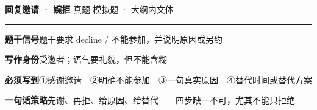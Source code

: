 \documentclass[11pt,a4paper]{ctexart}
\begin{document}
\clearpage
{}\label{g03}
\noindent{\color{accent}\rule{\linewidth}{1.5pt}}\par\vspace{3pt}
\hspace{6pt}
{\LARGE\bfseries 回复邀请 · 婉拒}\hfill
{\footnotesize\color{gray} 真题 模拟题 · 大纲内文体}\par
\vspace{1pt}
{\color{accent!35}\rule{\linewidth}{0.5pt}}\par\vspace{3pt}
{\footnotesize {\color{accent}\bfseries 题干信号}\quad 题干要求 decline / 不能参加，并说明原因或另约}\par
{\footnotesize {\color{accent}\bfseries 写作身份}\quad 受邀者；语气要礼貌，但不能含糊}\par
{\footnotesize {\color{accent}\bfseries 必须写到}\quad ①感谢邀请　②明确不能参加　③一句真实原因　④替代时间或替代方案}\par
{\footnotesize {\color{accent}\bfseries 一句话策略}\quad 先谢、再拒、给原因、给替代——四步缺一不可，尤其不能只拒绝}\par
\end{document}
